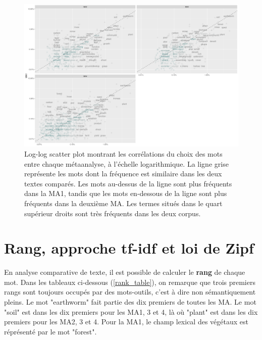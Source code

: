 \documentclass{book}
\begin{document}

\begin{figure}[htb] %
    \begin{center} %
        \includegraphics[width=1\textwidth]{scales_graph.png}
        \caption[Log-log scatter plot montrant les corrélations du choix des mots entre chaque métaanalyse, à l'échelle logarithmique.]{Log-log scatter plot montrant les corrélations du choix des mots entre chaque métaanalyse, à l'échelle logarithmique. La ligne grise représente les mots dont la fréquence est similaire dans les deux textes comparés. Les mots au-dessus de la ligne sont plus fréquents dans la MA1, tandis que les mots en-dessous de la ligne sont plus fréquents dans la deuxième MA. Les termes situés dans le quart supérieur droits sont très fréquents dans les deux corpus.\label{scales}}
    \end{center}  
\end{figure}

\clearpage

\section{Rang, approche tf-idf et loi de Zipf}
\noindent
 En analyse comparative de texte, il est possible de calculer le \textbf{rang} de chaque mot. Dans les tableaux ci-dessous (\cref{rank_table}), on remarque que trois premiers rangs sont toujours occupés par des mots-outils, c'est à dire non sémantiquement pleins. Le mot "earthworm" fait partie des dix premiers de toutes les MA. Le mot "soil" est dans les dix premiers pour les MA1, 3 et 4, là où "plant" est dans les dix premiers pour les MA2, 3 et 4. Pour la MA1, le champ lexical des végétaux est réprésenté par le mot "forest".
\end{document}
